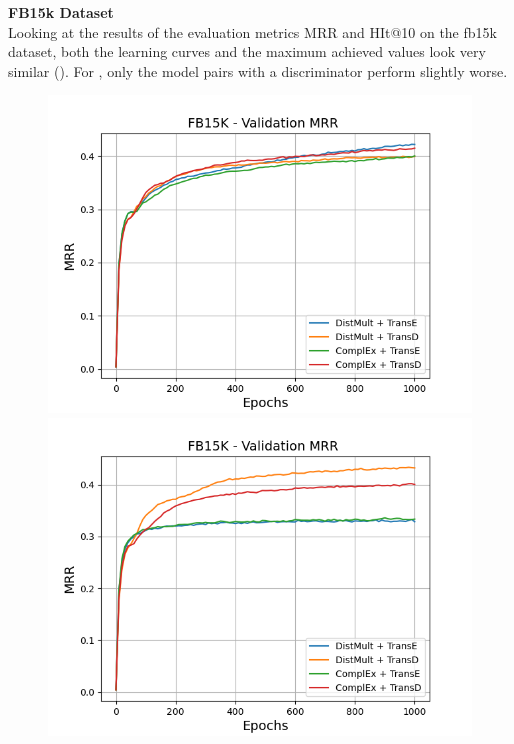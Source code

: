 \textbf{FB15k Dataset}
\label{subsubsec:uncertainty_fb15k}\\
%

Looking at the results of the evaluation metrics MRR and HIt@10 on the fb15k dataset, both the learning curves and the maximum achieved values look very similar ().
For \usgan, only the model pairs with a \transe discriminator perform slightly worse.
\begin{figure}[H]
    \centering
    \begin{minipage}{.5\textwidth}
      \centering
      \includegraphics[width=0.9\linewidth]{figures/results/gan_train/not_pretrained/random/fb15k/1k_epochs/random_fb15k_mrrs.png}
    \end{minipage}%
    \begin{minipage}{.5\textwidth}
      \centering
      \includegraphics[width=0.9\linewidth]{figures/results/gan_train/not_pretrained/uncertainty/max_distribution/entropy/fb15k/1k_epochs/uncertainty_fb15k_mrrs.png}

\end{minipage}
\end{figure}
